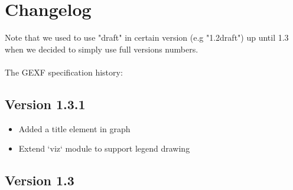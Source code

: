 \documentclass[a4paper,10pt]{article}
\begin{document}
\section{Changelog} \label{changelog}

Note that we used to use "draft" in certain version (e.g "1.2draft") up until 1.3 when we decided to simply use full versions numbers.

\paragraph{}
The GEXF specification history:

\subsection*{Version 1.3.1}

\begin{itemize}
\item Added a title element in graph
\item Extend `viz` module to support legend drawing
\end{itemize}

\subsection*{Version 1.3}
\end{document}
